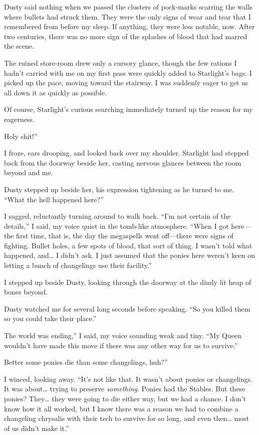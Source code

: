 Dusty said nothing when we passed the clusters of pock-marks scarring the walls where bullets had struck them. They were the only signs of wear and tear that I remembered from before my sleep. If anything, they were less notable, now. After two centuries, there was no more sign of the splashes of blood that had marred the scene.

The ruined store-room drew only a cursory glance, though the few rations I hadn’t carried with me on my first pass were quickly added to Starlight’s bags. I picked up the pace, moving toward the stairway. I was suddenly eager to get us all down it as quickly as possible.

Of course, Starlight’s curious searching immediately turned up the reason for my eagerness.

\leavevmode{}Holy shit!”

I froze, ears drooping, and looked back over my shoulder. Starlight had stepped back from the doorway beside her, casting nervous glances between the room beyond and me.

Dusty stepped up beside her, his expression tightening as he turned to me. “What the hell happened here?”

I sagged, reluctantly turning around to walk back. “I’m not certain of the details,” I said, my voice quiet in the tomb-like atmosphere. “When I got here—the first time, that is, the day the megaspells went off—there were signs of fighting. Bullet holes, a few spots of blood, that sort of thing. I wasn’t told what happened, and… I didn’t ask. I just assumed that the ponies here weren’t keen on letting a bunch of changelings use their facility.”

I stepped up beside Dusty, looking through the doorway at the dimly lit heap of bones beyond.

Dusty watched me for several long seconds before speaking. “So you killed them so you could take their place.”

\leavevmode{}The world was ending,” I said, my voice sounding weak and tiny. “My Queen wouldn’t have made this move if there was any other way for us to survive.”

\leavevmode{}Better some ponies die than some changelings, huh?”

I winced, looking away. “It’s not like that. It wasn’t about ponies or changelings. It was about… trying to preserve \textit{something}. Ponies had the Stables. But these ponies? They… they were going to die either way, but we had a chance. I don’t know how it all worked, but I know there was a reason we had to combine a changeling chrysalis with their tech to survive for so long, and even then… most of us didn’t make it.”

